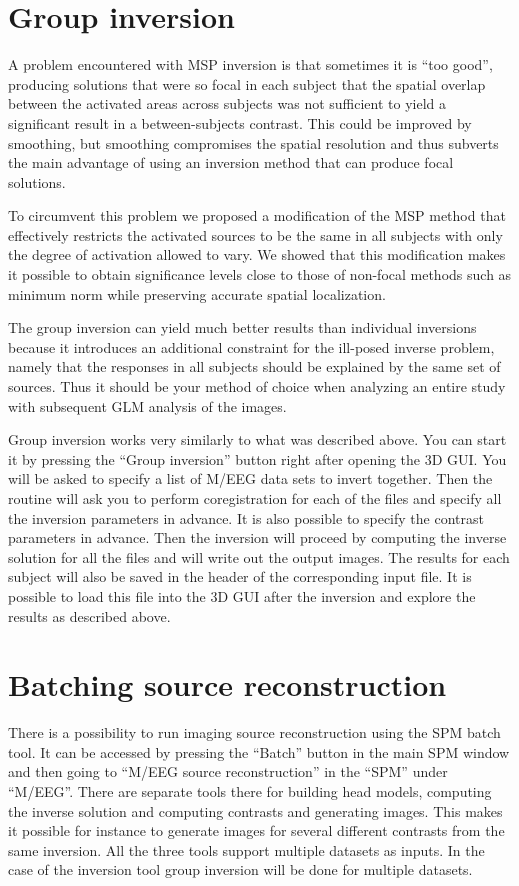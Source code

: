 \section{Group inversion}
A problem encountered with MSP inversion is that sometimes it is ``too good'', producing solutions that were so focal in each subject that the spatial overlap between the activated areas across subjects was not sufficient to yield a significant result in a between-subjects contrast. This could be improved by smoothing, but smoothing compromises the spatial resolution and thus subverts the main advantage of using an inversion method that can produce focal solutions.

To circumvent this problem we proposed a modification of the MSP method \cite{vl_group} that effectively restricts the activated sources to be the same in all subjects with only the degree of activation allowed to vary. We showed that this modification makes it possible to obtain significance levels close to those of non-focal methods such as minimum norm while preserving accurate spatial localization.

The group inversion can yield much better results than individual inversions because it introduces an additional constraint for the ill-posed inverse problem, namely that the responses in all subjects should be explained by the same set of sources. Thus it should be your method of choice when analyzing an entire study with subsequent GLM analysis of the images.

Group inversion works very similarly to what was described above. You can start it by pressing the ``Group inversion'' button right after opening the 3D GUI. You will be asked to specify a list of M/EEG data sets to invert together. Then the routine will ask you to perform coregistration for each of the files and specify all the inversion parameters in advance. It is also possible to specify the contrast parameters in advance. Then the inversion will proceed by computing the inverse solution for all the files and will write out the output images. The results for each subject will also be saved in the header of the corresponding input file. It is possible to load this file into the 3D GUI after the inversion and explore the results as described above.

\section{Batching source reconstruction}
There is a possibility to run imaging source reconstruction using the SPM batch tool. It can be accessed by pressing the ``Batch'' button in the main SPM window and then going to ``M/EEG source reconstruction'' in the ``SPM'' under ``M/EEG''. There are separate tools there for building head models, computing the inverse solution and computing contrasts and generating images. This makes it possible for instance to generate images for several different contrasts from the same inversion. All the three tools support multiple datasets as inputs. In the case of the inversion tool group inversion will be done for multiple datasets.

